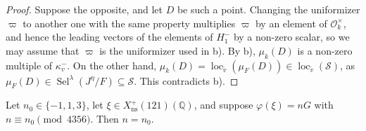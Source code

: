 \documentclass[11pt,reqno]{amsart}
\DeclareMathOperator{\Sel}{Sel}
\DeclareMathOperator{\loc}{loc}
\newcommand{\Q}{\mathbb{Q}}
\newcommand{\OO}{\mathcal{O}}
\newcommand{\ns}{\mathrm{ns}}
\newcommand{\Xns}[1]{X_{\ns}^+(#1)}
\theoremstyle{definition}
\numberwithin{equation}{section}
\begin{document}
\begin{proof}
Suppose the opposite, and let $D$ be such a point. Changing the uniformizer $\varpi$ to another one with the same property multiplies $\varpi$ by an element of $\OO_k^\times$, and hence the leading vectors of the elements of $H_1^-$ by a non-zero scalar, so we may assume that $\varpi$ is the uniformizer used in  b). By  b), $\mu_k(D)$ is a non-zero multiple of $\kappa_v^-$. On the other hand, $\mu_k(D)=\loc_{\tilde v}(\mu_F(D))\in\loc_{\tilde v}(\mathcal S)$, as $\mu_F(D)\in\Sel^\lambda(J^\eta/F)\subseteq\mathcal S$. This contradicts  b).
\end{proof}

\begin{proposition}\label{prop:odd}
Let $n_0\in\{-1,1,3\}$, let $\xi\in\Xns{121}(\Q)$, and suppose $\varphi(\xi)=nG$ with $n\equiv n_0\pmod{4356}$. Then $n=n_0$.
\end{proposition}
\end{document}
